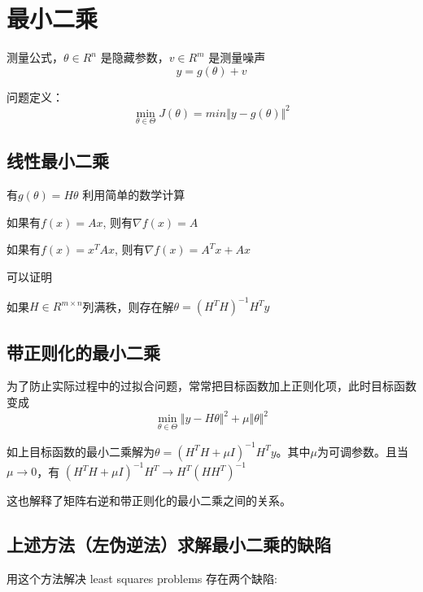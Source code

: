 \section{最小二乘}
测量公式，$\theta \in R^n$ 是隐藏参数，$ v \in R^m $ 是测量噪声
\begin{equation}
  y = g(\theta) + v
\end{equation}

问题定义：
\begin{equation}
  \min_{\theta \in \Theta}J(\theta) = min \Vert y - g(\theta) \Vert ^2
\end{equation}

\subsection{线性最小二乘}
有$g(\theta) = H \theta $
利用简单的数学计算
\begin{theorembox}
	如果有$f(x) = Ax$, 则有$\nabla f(x) = A$
\end{theorembox}
\begin{theorembox}
	如果有$f(x) = x^TAx$, 则有$\nabla f(x) = A^Tx+Ax$
\end{theorembox}
可以证明
\begin{theorembox}
	如果$H\in R^{m\times n}$列满秩，则存在解$\theta = (H^TH)^{-1}H^Ty$ 
\end{theorembox}
\subsection{带正则化的最小二乘}\label{ModernControl::sec::regularized-least-squares}
为了防止实际过程中的过拟合问题，常常把目标函数加上正则化项，此时目标函数变成
\begin{equation*}
	\min_{\theta \in \Theta} \Vert y - H\theta \Vert ^2 + \mu \Vert \theta \Vert ^2
\end{equation*}
\begin{theorembox}
	如上目标函数的最小二乘解为$\theta = (H^TH + \mu I)^{-1}H^Ty$。其中$\mu$为可调参数。且当$\mu \rightarrow 0$，有 $(H^TH + \mu I)^{-1}H^T \rightarrow H^T(HH^T)^{-1}$
\end{theorembox}
这也解释了矩阵右逆和带正则化的最小二乘之间的关系。
\subsection{上述方法（左伪逆法）求解最小二乘的缺陷}
用这个方法解决 least squares problems 存在两个缺陷:

